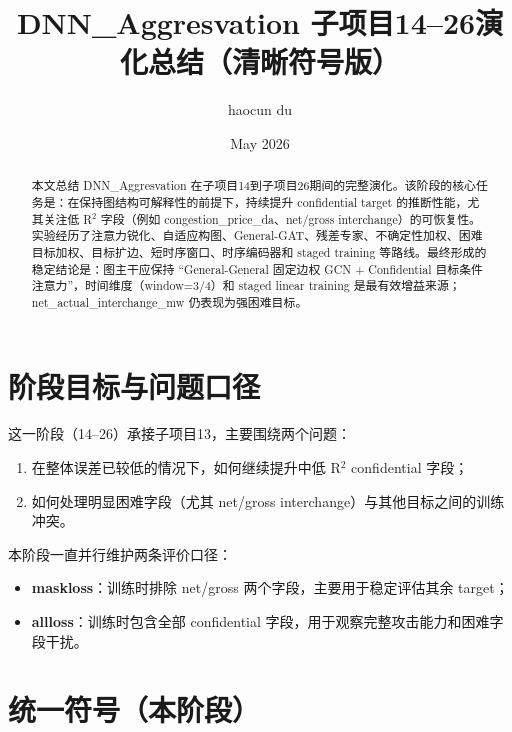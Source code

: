 \documentclass[UTF8]{ctexart}
\title{DNN\_Aggresvation 子项目14--26演化总结（清晰符号版）}
\author{haocun du}
\date{May 2026}
\begin{document}
\maketitle

\begin{abstract}
本文总结 DNN\_Aggresvation 在子项目14到子项目26期间的完整演化。该阶段的核心任务是：在保持图结构可解释性的前提下，持续提升 confidential target 的推断性能，尤其关注低 R\(^2\) 字段（例如 congestion\_price\_da、net/gross interchange）的可恢复性。实验经历了注意力锐化、自适应构图、General-GAT、残差专家、不确定性加权、困难目标加权、目标扩边、短时序窗口、时序编码器和 staged training 等路线。最终形成的稳定结论是：图主干应保持 ``General-General 固定边权 GCN + Confidential 目标条件注意力''，时间维度（window=3/4）和 staged linear training 是最有效增益来源；net\_actual\_interchange\_mw 仍表现为强困难目标。
\end{abstract}

\section{阶段目标与问题口径}

这一阶段（14--26）承接子项目13，主要围绕两个问题：
\begin{enumerate}
    \item 在整体误差已较低的情况下，如何继续提升中低 R\(^2\) confidential 字段；
    \item 如何处理明显困难字段（尤其 net/gross interchange）与其他目标之间的训练冲突。
\end{enumerate}

本阶段一直并行维护两条评价口径：
\begin{itemize}
    \item \textbf{maskloss}：训练时排除 net/gross 两个字段，主要用于稳定评估其余 target；
    \item \textbf{allloss}：训练时包含全部 confidential 字段，用于观察完整攻击能力和困难字段干扰。
\end{itemize}

\section{统一符号（本阶段）}
\end{document}
